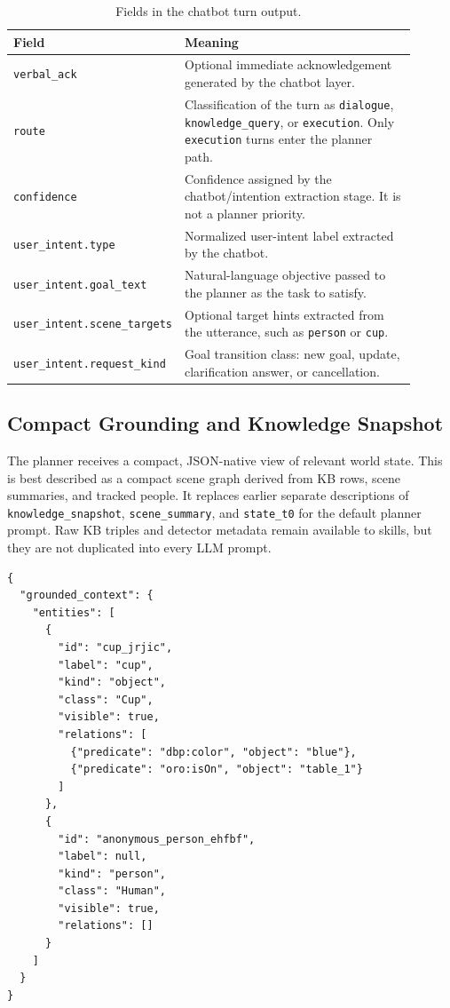 \documentclass[12pt,a4paper]{article}
\newcommand{\code}[1]{\texttt{#1}}
\begin{document}
\begin{longtable}{p{0.28\linewidth}p{0.62\linewidth}}
\caption{Fields in the chatbot turn output.}\label{tab:chatbot-fields}\\
\toprule
Field & Meaning\\
\midrule
\code{verbal\_ack} & Optional immediate acknowledgement generated by the chatbot layer.\\
\code{route} & Classification of the turn as \code{dialogue}, \code{knowledge\_query}, or \code{execution}. Only \code{execution} turns enter the planner path.\\
\code{confidence} & Confidence assigned by the chatbot/intention extraction stage. It is not a planner priority.\\
\code{user\_intent.type} & Normalized user-intent label extracted by the chatbot.\\
\code{user\_intent.goal\_text} & Natural-language objective passed to the planner as the task to satisfy.\\
\code{user\_intent.scene\_targets} & Optional target hints extracted from the utterance, such as \code{person} or \code{cup}.\\
\code{user\_intent.request\_kind} & Goal transition class: new goal, update, clarification answer, or cancellation.\\
\bottomrule
\end{longtable}

\subsection{Compact Grounding and Knowledge Snapshot}

The planner receives a compact, JSON-native view of relevant world state. This is best described as a compact scene graph derived from KB rows, scene summaries, and tracked people. It replaces earlier separate descriptions of \code{knowledge\_snapshot}, \code{scene\_summary}, and \code{state\_t0} for the default planner prompt. Raw KB triples and detector metadata remain available to skills, but they are not duplicated into every LLM prompt.

\begin{lstlisting}
{
  "grounded_context": {
    "entities": [
      {
        "id": "cup_jrjic",
        "label": "cup",
        "kind": "object",
        "class": "Cup",
        "visible": true,
        "relations": [
          {"predicate": "dbp:color", "object": "blue"},
          {"predicate": "oro:isOn", "object": "table_1"}
        ]
      },
      {
        "id": "anonymous_person_ehfbf",
        "label": null,
        "kind": "person",
        "class": "Human",
        "visible": true,
        "relations": []
      }
    ]
  }
}
\end{lstlisting}
\end{document}
